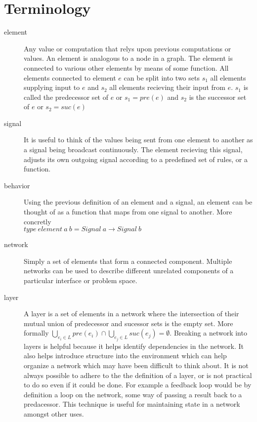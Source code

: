 \documentclass[twocolumn]{paper}
\begin{document}
\section{Terminology}
\begin{description}
\item[element] Any value or computation that relys upon previous computations or values. An element is analogous to a node in a graph. The element is connected to various other elements by means of some function. All elements connected to element $e$ can be split into two sets $s_1$ all elements supplying input to $e$ and $s_2$ all elements recieving their input from $e$. $s_1$ is called the predecessor set of $e$ or $s_1 = pre(e)$ and $s_2$ is the successor set of $e$ or $s_2 = suc(e)$

\item[signal] It is useful to think of the values being sent from one element to another as a signal being broadcast continuously. The element recieving this signal, adjusts its own outgoing signal according to a predefined set of rules, or a function.

\item[behavior] Using the previous definition of an element and a signal, an element can be thought of as a function that maps from one signal to another. More concretly\\
  $type~element~a~b = Signal ~a \rightarrow Signal ~b$


\item[network] Simply a set of elements that form a connected component. Multiple networks can be used to describe different unrelated components of a particular interface or problem space.

\item[layer] A layer is a set of elements in a network where the intersection of their mutual union of predecessor and sucessor sets is the empty set. More formally $\bigcup_{e_i \in L}{pre(e_i)} \cap \bigcup_{e_j \in L}{suc(e_j)} = \emptyset$. Breaking a network into layers is helpful because it helps identify dependencies in the network. It also helps introduce structure into the environment which can help organize a network which may have been difficult to think about. It is not always possible to adhere to the the definition of a layer, or is not practical to do so even if it could be done. For example a feedback loop would be by definition a loop on the network, some way of passing a result back to a predacessor. This technique is useful for maintaining state in a network amongst other uses.




\end{description}
\end{document}

